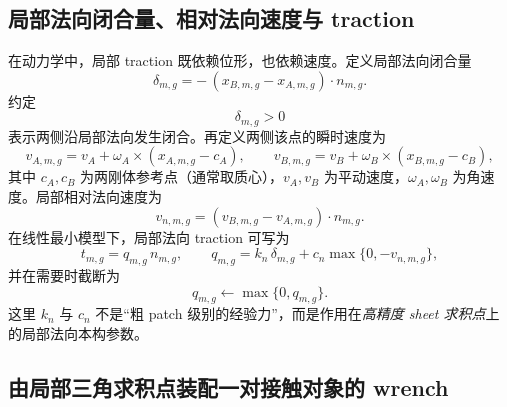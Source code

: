 \documentclass[12pt,a4paper]{ctexart}
\begin{document}
\subsection{局部法向闭合量、相对法向速度与 traction}

在动力学中，局部 traction 既依赖位形，也依赖速度。定义局部法向闭合量
\begin{equation}
    \delta_{m,g}= -\,(x_{B,m,g}-x_{A,m,g})\cdot n_{m,g}.
\end{equation}
约定
\begin{equation}
    \delta_{m,g}>0
\end{equation}
表示两侧沿局部法向发生闭合。再定义两侧该点的瞬时速度为
\begin{equation}
    v_{A,m,g}=v_A + \omega_A\times(x_{A,m,g}-c_A),
    \qquad
    v_{B,m,g}=v_B + \omega_B\times(x_{B,m,g}-c_B),
\end{equation}
其中 $c_A,c_B$ 为两刚体参考点（通常取质心），$v_A,v_B$ 为平动速度，$\omega_A,\omega_B$ 为角速度。局部相对法向速度为
\begin{equation}
    v_{n,m,g} = (v_{B,m,g}-v_{A,m,g})\cdot n_{m,g}.
\end{equation}
在线性最小模型下，局部法向 traction 可写为
\begin{equation}
    t_{m,g} = q_{m,g} \, n_{m,g},
    \qquad
    q_{m,g}=k_n\,\delta_{m,g}+c_n\max\{0,-v_{n,m,g}\},
\end{equation}
并在需要时截断为
\begin{equation}
    q_{m,g} \leftarrow \max\{0,q_{m,g}\}.
\end{equation}
这里 $k_n$ 与 $c_n$ 不是“粗 patch 级别的经验力”，而是作用在\emph{高精度 sheet 求积点}上的局部法向本构参数。

\subsection{由局部三角求积点装配一对接触对象的 wrench}
\end{document}
